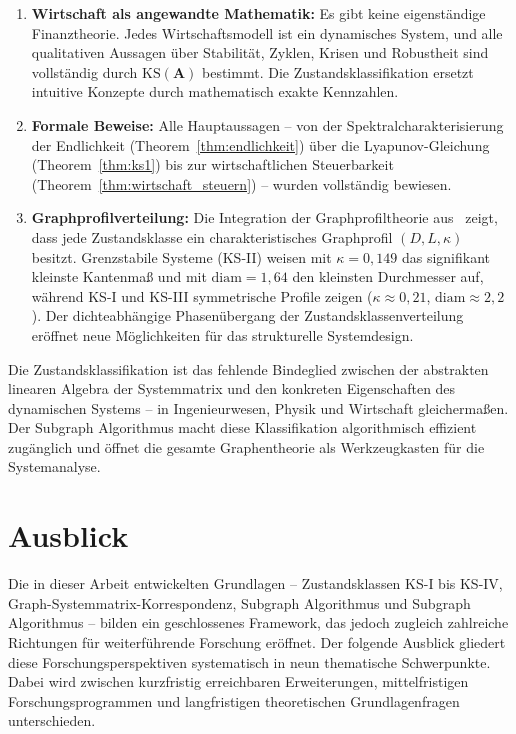 ﻿\documentclass[12pt, a4paper, titlepage]{report}
\theoremstyle{definition}
\theoremstyle{remark}
\newcommand{\vA}{\bm{A}}
\newcommand{\KS}{\mathrm{KS}}
\begin{document}
\begin{enumerate}[label=(\roman*)]
  \item \textbf{Wirtschaft als angewandte Mathematik:} Es gibt keine eigenständige
    Finanztheorie. Jedes Wirtschaftsmodell ist ein dynamisches System, und alle
    qualitativen Aussagen über Stabilität, Zyklen, Krisen und Robustheit sind
    vollständig durch $\KS(\vA)$ bestimmt. Die Zustandsklassifikation ersetzt
    intuitive Konzepte durch mathematisch exakte Kennzahlen.

  \item \textbf{Formale Beweise:} Alle Hauptaussagen -- von der Spektralcharakterisierung
    der Endlichkeit (Theorem~\ref{thm:endlichkeit}) über die Lyapunov-Gleichung
    (Theorem~\ref{thm:ks1}) bis zur wirtschaftlichen Steuerbarkeit
    (Theorem~\ref{thm:wirtschaft_steuern}) -- wurden vollständig bewiesen.

  \item \textbf{Graphprofilverteilung:} Die Integration der Graphprofiltheorie
    aus~\citep{epp2026graphs} zeigt, dass jede Zustandsklasse ein charakteristisches
    Graphprofil $(D, L, \kappa)$ besitzt. Grenzstabile Systeme (KS-II) weisen
    mit $\kappa = 0{,}149$ das signifikant kleinste Kantenmaß und mit
    $\mathrm{diam} = 1{,}64$ den kleinsten Durchmesser auf, während KS-I und KS-III
    symmetrische Profile zeigen ($\kappa \approx 0{,}21$, $\mathrm{diam} \approx 2{,}2$).
    Der dichteabhängige Phasenübergang der Zustandsklassenverteilung eröffnet neue
    Möglichkeiten für das strukturelle Systemdesign.
\end{enumerate}

Die Zustandsklassifikation ist das fehlende Bindeglied zwischen der abstrakten linearen
Algebra der Systemmatrix und den konkreten Eigenschaften des dynamischen Systems --
in Ingenieurwesen, Physik und Wirtschaft gleichermaßen. Der Subgraph Algorithmus
macht diese Klassifikation algorithmisch effizient zugänglich und öffnet die gesamte
Graphentheorie als Werkzeugkasten für die Systemanalyse.

\chapter{Ausblick}
\label{sec:ausblick}

Die in dieser Arbeit entwickelten Grundlagen -- Zustandsklassen KS-I bis KS-IV,
Graph-Systemmatrix-Korrespondenz, Subgraph Algorithmus und Subgraph Algorithmus --
bilden ein geschlossenes Framework, das jedoch zugleich zahlreiche Richtungen für
weiterführende Forschung eröffnet. Der folgende Ausblick gliedert diese
Forschungsperspektiven systematisch in neun thematische Schwerpunkte. Dabei wird
zwischen kurzfristig erreichbaren Erweiterungen, mittelfristigen Forschungsprogrammen
und langfristigen theoretischen Grundlagenfragen unterschieden.
\end{document}
